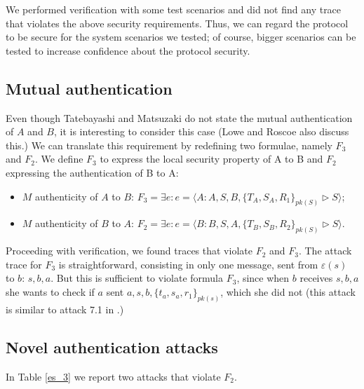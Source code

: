 \documentclass{entcs} \usepackage{entcsmacro}
\newcommand{\INT}{\ensuremath{\varepsilon}}
\begin{document}
We performed verification with some test scenarios and did not find any trace that violates the above 
security requirements. Thus, we can regard the protocol to be secure for the 
system scenarios we tested; of course, bigger scenarios can be tested to 
increase confidence about the protocol security.

\subsection{Mutual authentication} Even though Tatebayashi and Matsuzaki do not state the
mutual authentication of $A$ and $B$, it is interesting to consider
this case (Lowe and Roscoe \cite{LR97} also discuss this.) We can
translate this requirement by redefining two formulae, namely $F_3$
and $F_2$. We define $F_3$ to express the local security property of A
to B and $F_2$ expressing the authentication of B to A:

\begin{itemize}
 \item $M$ authenticity of $A$ to $B$: $ F_3 = \exists e: e=\langle A:
 A,S,B,\{T_A,S_A,R_1\}_{pk(S)} \triangleright S  \rangle$;
 \item  $M$ authenticity of $B$ to $A$: $ F_2 = \exists e: e= \langle B:  B,S,A,\{T_B,
 S_B,R_2\}_{pk(S)} \triangleright S  \rangle $.
 \end{itemize}

Proceeding with verification, we found traces that violate $F_2$ and
$F_3$.  The attack trace for $F_3$ is straightforward, consisting in
only one message, sent from $\INT(s)$ to $b$: $s,b,a$. But this is
sufficient to violate formula $F_3$, since when $b$ receives
$s,b,a$ she wants to check if $a$ sent $
a,s,b,\{t_a,s_a,r_1\}_{pk(s)}$, which she did not (this attack is similar
to attack 7.1 in \cite{LR97}.)

\subsection{Novel authentication attacks}
In Table \ref{es_3} we report two attacks that violate $F_2$.
\end{document}
